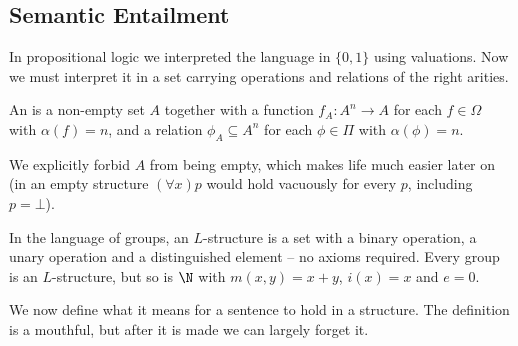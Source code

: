 \subsection{Semantic Entailment}

In propositional logic we interpreted the language in $\{0, 1\}$ using valuations. Now we must interpret it in a set carrying operations and relations of the right arities.

\begin{definition}[Structure]
  An  is a non-empty set $A$ together with a function $f_A: A^n \rightarrow A$ for each $f \in \Omega$ with $\alpha(f) = n$, and a relation $\phi_A \subseteq A^n$ for each $\phi \in \Pi$ with $\alpha(\phi) = n$.
\end{definition}

\begin{remark}
  We explicitly forbid $A$ from being empty, which makes life much easier later on (in an empty structure $(\forall x)p$ would hold vacuously for every $p$, including $p = \bot$).
\end{remark}

\begin{example}
  In the language of groups, an $L$-structure is a set with a binary operation, a unary operation and a distinguished element -- no axioms required. Every group is an $L$-structure, but so is $\N$ with $m(x,y) = x + y$, $i(x) = x$ and $e = 0$.
\end{example}

We now define what it means for a sentence to hold in a structure. The definition is a mouthful, but after it is made we can largely forget it.


